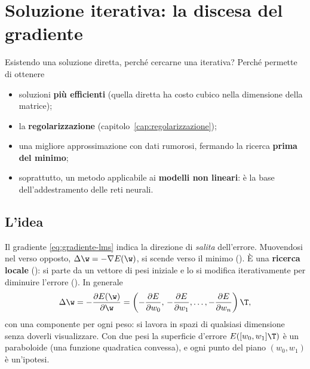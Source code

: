\section{Soluzione iterativa: la discesa del gradiente}
\label{sec:discesa}

Esistendo una soluzione diretta, perché cercarne una iterativa? Perché permette di ottenere
\begin{itemize}
  \item soluzioni \textbf{più efficienti} (quella diretta ha costo cubico nella dimensione della matrice);
  \item la \textbf{regolarizzazione} (capitolo~\ref{cap:regolarizzazione});
  \item una migliore approssimazione con dati rumorosi, fermando la ricerca \textbf{prima del minimo};
  \item soprattutto, un metodo applicabile ai \textbf{modelli non lineari}: è la base dell'addestramento delle
        reti neurali.
\end{itemize}

\subsection{L'idea}

Il gradiente \eqref{eq:gradiente-lms} indica la direzione di \emph{salita} dell'errore. Muovendosi nel verso
opposto, $\Delta\w = -\nabla E(\w)$, si scende verso il minimo (). È una \textbf{ricerca
locale} (): si parte da un vettore di pesi iniziale e lo si modifica iterativamente per
diminuire l'errore (). In generale
\[
\Delta\w = -\frac{\partial E(\w)}{\partial\w} = \left(-\frac{\partial E}{\partial w_0},\,-\frac{\partial E}{\partial w_1},\dots,-\frac{\partial E}{\partial w_n}\right)\T ,
\]
con una componente per ogni peso: si lavora in spazi di qualsiasi dimensione senza doverli visualizzare. Con
due pesi la superficie d'errore $E([w_0,w_1]\T)$ è un paraboloide (una funzione quadratica convessa), e ogni punto
del piano $(w_0,w_1)$ è un'ipotesi.

